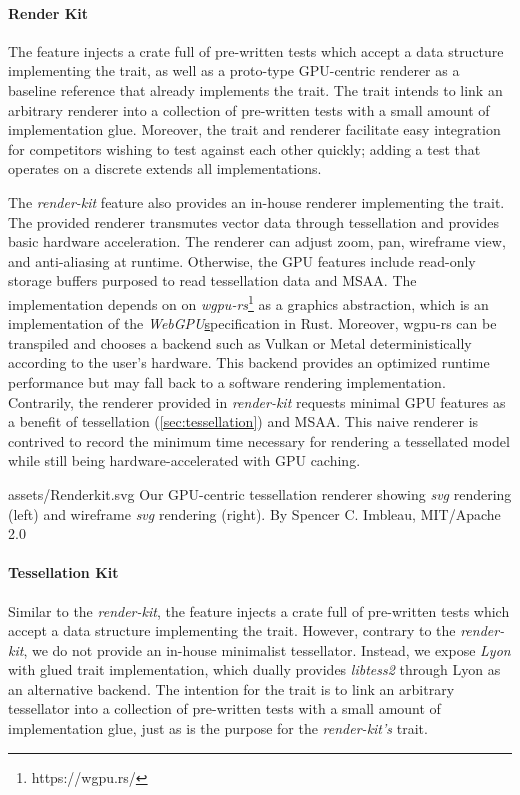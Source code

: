 \paragraph{Render Kit}\label{sec:render-kit}
The  feature injects a crate full of pre-written tests which accept a data structure implementing the  trait, as well as a proto-type GPU-centric renderer as a baseline reference that already implements the  trait. The  trait intends to link an arbitrary renderer into a collection of pre-written tests with a small amount of implementation glue. Moreover, the trait and renderer facilitate easy integration for competitors wishing to test against each other quickly; adding a test that operates on a discrete  extends all implementations.\medskip

The \textit{render-kit} feature also provides an in-house renderer implementing the  trait. The provided renderer transmutes vector data through tessellation and provides basic hardware acceleration. The renderer can adjust zoom, pan, wireframe view, and anti-aliasing at runtime. Otherwise, the GPU features include read-only storage buffers purposed to read tessellation data and MSAA. The implementation depends on on \textit{wgpu-rs}\footnote{https://wgpu.rs/} as a graphics abstraction, which is an implementation of the \textit{WebGPU}\href{https://www.w3.org/community/gpu/} specification in Rust. Moreover, wgpu-rs can be transpiled and chooses a backend such as Vulkan or Metal deterministically according to the user's hardware. This backend provides an optimized runtime performance but may fall back to a software rendering implementation. Contrarily, the renderer provided in \textit{render-kit} requests minimal GPU features as a benefit of tessellation (\cref{sec:tessellation}) and MSAA. This naive renderer is contrived to record the minimum time necessary for rendering a tessellated model while still being hardware-accelerated with GPU caching.\medskip

\widesvg
{assets/Renderkit.svg}
{Our  GPU-centric tessellation renderer showing \textit{svg} rendering (left) and wireframe \textit{svg} rendering (right).}
{By Spencer C. Imbleau, MIT/Apache 2.0}

\paragraph{Tessellation Kit}
Similar to the \textit{render-kit}, the  feature injects a crate full of pre-written tests which accept a data structure implementing the  trait. However, contrary to the \textit{render-kit}, we do not provide an in-house minimalist tessellator. Instead, we expose \textit{Lyon}\cite{Lyon} with glued trait implementation, which dually provides \textit{libtess2} through Lyon as an alternative backend. The intention for the  trait is to link an arbitrary tessellator into a collection of pre-written tests with a small amount of implementation glue, just as is the purpose for the \textit{render-kit's}  trait.